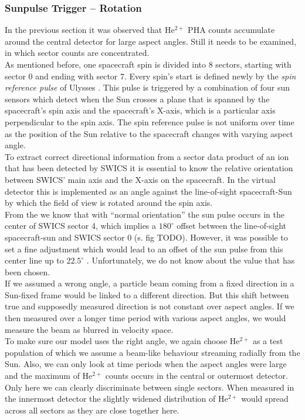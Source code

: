 \subsubsection{Sunpulse Trigger -- Rotation}
In the previous section it was observed that $\mathrm{He^{2+}}$ PHA counts accumulate around the central detector for large aspect angles. Still it needs to be examined, in which sector counts are concentrated.\\
As mentioned before, one spacecraft spin is divided into 8 sectors, starting with sector 0 and ending with sector 7. Every spin's start is defined newly by the \textit{spin reference pulse} of Ulysses \citep{hiscale}. This pulse is triggered by a combination of four sun sensors which detect when the Sun crosses a plane that is spanned by the spacecraft's spin axis and the spacecraft's X-axis, which is a particular axis perpendicular to the spin axis. The spin reference pulse is not uniform over time as the position of the Sun relative to the spacecraft changes with varying aspect angle.\\
To extract correct directional information from a sector data product of an ion that has been detected by SWICS it is essential to know the relative orientation between SWICS' main axis and the X-axis on the spacecraft. In the virtual detector this is implemented as an angle against the line-of-sight spacecraft-Sun by which the field of view is rotated around the spin axis.\\
From the \citet[][S.20-22]{swics_dpu} we know that with ``normal orientation'' the sun pulse occurs in the center of SWICS sector 4, which implies a $180^\circ$ offset between the line-of-sight spacecraft-sun and SWICS sector 0 (s. fig TODO). However, it was possible to set a fine adjustment which would lead to an offset of the sun pulse from this center line up to $22.5^\circ$ \citet[][S.48]{swics_dpu}. Unfortunately, we do not know about the value that has been chosen.
\\
If we assumed a wrong angle, a particle beam coming from a fixed direction in a Sun-fixed frame would be linked to a different direction. But this shift between true and supposedly measured direction is not constant over aspect angles. If we then measured over a longer time period with various aspect angles, we would measure the beam as blurred in velocity space.
\\
To make sure our model uses the right angle, we again choose $\mathrm{He^{2+}}$ as a test population of which we assume a beam-like behaviour streaming radially from the Sun. Also, we can only look at time periods when the aspect angles were large and the maximum of $\mathrm{He^{2+}}$ counts occurs in the central or outermost detector. Only here we can clearly discriminate between single sectors. When measured in the innermost detector the slightly widened distribution of $\mathrm{He^{2+}}$ would spread across all sectors as they are close together here.
